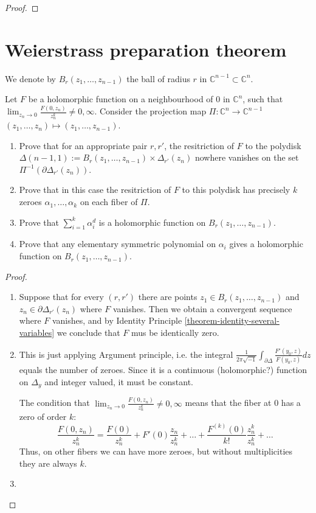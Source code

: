 \begin{proof}

\end{proof}

\section{Weierstrass preparation theorem}
\label{section-Weierstrass-preparation-theorem}

We denote by $B_r(z_1,\ldots,z_{n-1})$ the ball of radius $r$ in
$\mathbb{C}^{n-1}\subset\mathbb{C}^n$.

\begin{exercise}
\label{exercise-polydisks}
Let $F$ be a holomorphic function on a neighbourhood of $0$ in $\mathbb{C}^n$,
such that $\lim_{z_n\to 0} \frac{F(0,z_n)}{z_n^k}\neq 0,\infty$.
Consider the projection map $\Pi:\mathbb{C}^n\to\mathbb{C}^{n-1}$ 
$(z_1,\ldots,z_n)\mapsto (z_1,\ldots,z_{n-1})$.
\begin{enumerate}
\item Prove that for an appropriate pair $r,r'$, the resitriction of $F$ to the
polydisk $\Delta(n-1,1):=B_r(z_1,\ldots,z_{n-1})\times\Delta_{r'}(z_n)$ nowhere
vanishes on the set $\Pi^{-1}(\partial\Delta_{r'}(z_n))$.
\item Prove that in this case the resitriction of $F$ to this polydisk has
precisely $k$ zeroes $\alpha_1,\ldots,\alpha_k$ on each fiber of $\Pi$.
\item Prove that $\sum_{i=1}^k \alpha_i^d$ is a holomorphic function on
$B_r(z_1,\ldots,z_{n-1})$.
\item Prove that any elementary symmetric polynomial on $\alpha_i$ gives a
holomorphic function on $B_r(z_1,\ldots,z_{n-1})$.
\end{enumerate}
\end{exercise}

\begin{proof}
\begin{enumerate}
\item Suppose that for every $(r,r')$ there are points 
$z_1\in B_r(z_1,\ldots,z_{n-1})$ and $z_n\in \partial\Delta_{r'}(z_n)$
where $F$ vanishes. Then we obtain a convergent sequence where $F$
vanishes, and by Identity Principle \ref{theorem-identity-several-variables} we
conclude that $F$ mus be identically zero.
\item This is just applying Argument principle, i.e. the integral 
$\frac{1}{2\pi\sqrt{-1}}\int_{\partial \Delta}\frac{F'(y_0,z)}{F(y_0,z)}dz$ 
equals the number of zeroes. Since it is a continuous (holomorphic?) function on
$\Delta_y$ and integer valued, it must be constant.

The condition that $\lim_{z_n\to0}\frac{F(0,z_n)}{z_n^k}\neq 0,\infty$ means
that the fiber at 0 has a zero of order $k$:
$$
\frac{F(0,z_n)}{z_n^k}=\frac{F(0)}{z_n^k}+F'(0)\frac{z_n}{z_n^k}+\ldots
+\frac{F^{(k)}(0)}{k!}\frac{z_n^k}{z_n^k}+\ldots
$$
Thus, on other fibers we can have
more zeroes, but without multiplicities they are always $k$.
\item 
\end{enumerate}
\end{proof}

